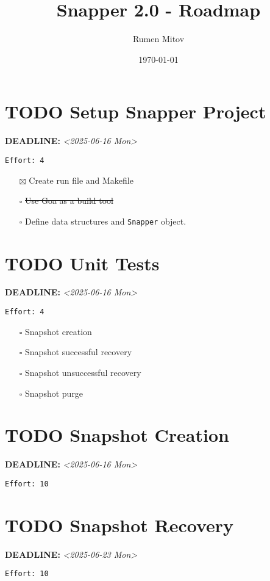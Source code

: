 \documentclass[11pt]{article}
\author{Rumen Mitov}
\date{\today}
\title{Snapper 2.0 - Roadmap}
\begin{document}
\maketitle
\section{{\bfseries\sffamily TODO}  Setup Snapper Project}
\label{sec:orgc52fb17}
\noindent\textbf{DEADLINE:} \textit{<2025-06-16 Mon>}\\
\begin{verbatim}
Effort: 4
\end{verbatim}
\begin{itemize}
\item[{$\boxtimes$}] Create run file and Makefile
\item[{$\square$}] \sout{Use Goa as a build tool}
\item[{$\square$}] Define data structures and \texttt{Snapper} object.
\end{itemize}
\section{{\bfseries\sffamily TODO}  Unit Tests}
\label{sec:org3dcc74b}
\noindent\textbf{DEADLINE:} \textit{<2025-06-16 Mon>}\\
\begin{verbatim}
Effort: 4
\end{verbatim}
\begin{itemize}
\item[{$\square$}] Snapshot creation
\item[{$\square$}] Snapshot successful recovery
\item[{$\square$}] Snapshot unsuccessful recovery
\item[{$\square$}] Snapshot purge
\end{itemize}
\section{{\bfseries\sffamily TODO}  Snapshot Creation}
\label{sec:org85f5831}
\noindent\textbf{DEADLINE:} \textit{<2025-06-16 Mon>}\\
\begin{verbatim}
Effort: 10
\end{verbatim}
\section{{\bfseries\sffamily TODO}  Snapshot Recovery}
\label{sec:orgabc51e4}
\noindent\textbf{DEADLINE:} \textit{<2025-06-23 Mon>}\\
\begin{verbatim}
Effort: 10
\end{verbatim}
\end{document}
